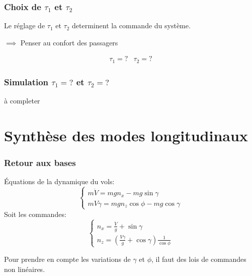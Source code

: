 \documentclass[tikz, footheight=2em]{beamer}
\begin{document}
\begin{frame}
    \frametitle{Choix de \( \tau_1 \) et \( \tau_2\)} \pause{}
    Le réglage de \( \tau_1 \) et \( \tau_2\) determinent la commande
    du système.\pause{}
    \begin{center}
        \( \implies \) Penser au confort des passagers
    \end{center}
    \pause{}
    \[
    \boxed{
    \begin{array}{ll}
        \tau_1 =  ? & \tau_2 = ?
    \end{array}
    }
    \]

\end{frame}

\begin{frame}
    \frametitle{Simulation \( \tau_1 = ? \) et \( \tau_2 = ? \)} \pause{}
    \begin{center}
        à completer
    \end{center}
\end{frame}

\section{Synthèse des modes longitudinaux}


\begin{frame}
    \frametitle{Retour aux bases} \pause{}
    Équations de la dynamique du vols:
    \[
    \left \{
    \begin{array}{l}
        m \dot{V} = mg n_x - mg \sin \gamma \\
        m V \dot{\gamma} = mg n_z \cos \phi - mg \cos \gamma
    \end{array}
    \right.
    \]\pause{}
    Soit les commandes:
    \[
    \left \{
    \begin{array}{l}
        n_x = \frac{\dot{V}}{g} + \sin \gamma \\
        n_z = \left(\frac{V \dot{\gamma}}{g} + \cos \gamma\right)
        \frac{1}{\cos \phi}
    \end{array}
    \right.
    \]\pause{}
    \begin{center}
        Pour prendre en compte les variations de \( \gamma \) et \( \phi \), il
        faut des lois de commandes non linéaires.
    \end{center}
\end{frame}
\end{document}
